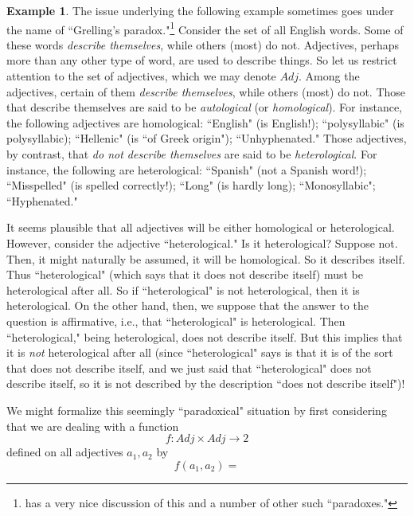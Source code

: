 \documentclass[11pt]{book}
\theoremstyle{definition}
\newtheorem{example}{Example}[section]
\theoremstyle{definition}
\theoremstyle{definition}
\theoremstyle{theorem}
\theoremstyle{definition}
\begin{document}
\begin{example} 
The issue underlying the following example sometimes goes under the name of ``Grelling's paradox."\footnote{\cite{yanofsky_universal_2003} has a very nice discussion of this and a number of other such ``paradoxes."} Consider the set of all English words. Some of these words \textit{describe themselves}, while others (most) do not. Adjectives, perhaps more than any other type of word, are used to describe things. So let us restrict attention to the set of adjectives, which we may denote $Adj$. Among the adjectives, certain of them \textit{describe themselves}, while others (most) do not. Those that describe themselves are said to be \textit{autological} (or \textit{homological}). For instance, the following adjectives are homological: ``English" (is English!); ``polysyllabic" (is polysyllabic); ``Hellenic" (is ``of Greek origin"); ``Unhyphenated." Those adjectives, by contrast, that \textit{do not describe themselves} are said to be \textit{heterological}. For instance, the following are heterological: ``Spanish" (not a Spanish word!); ``Misspelled" (is spelled correctly!); ``Long" (is hardly long); ``Monosyllabic"; ``Hyphenated." \par
It seems plausible that all adjectives will be either homological or heterological. However, consider the adjective ``heterological." Is it heterological? Suppose not. Then, it might naturally be assumed, it will be homological. So it describes itself. Thus ``heterological" (which says that it does not describe itself) must be heterological after all. So if ``heterological" is not heterological, then it is heterological. On the other hand, then, we suppose that the answer to the question is affirmative, i.e., that ``heterological" is heterological. Then ``heterological," being heterological, does not describe itself. But this implies that it is \textit{not} heterological after all (since ``heterological" says is that it is of the sort that does not describe itself, and we just said that ``heterological" does not describe itself, so it is not described by the description ``does not describe itself")! \par  
We might formalize this seemingly ``paradoxical" situation by first considering that we are dealing with a function
\begin{equation*}
f: Adj \times Adj \rightarrow 2
\end{equation*}
defined on all adjectives $a_1, a_2$ by 
\begin{equation*}
f(a_1, a_2) = 

\end{equation*}
\end{example}
\end{document}
